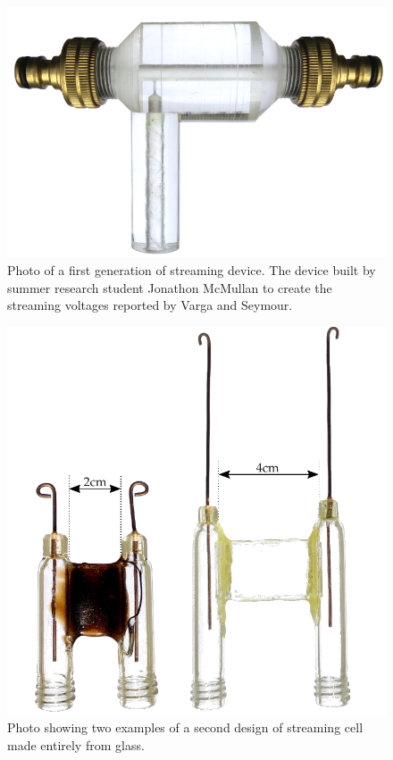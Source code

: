     \begin{figure}
      \centering
      \includegraphics[scale=0.9]{content/pt1/01-PowerHarvesting/graphics/StreamingCell_v0}
      \caption[Photo showing a first generation of streaming device.]{\label{fig:first_cell}Photo of a first generation of streaming device. The device built by summer research student Jonathon McMullan to create the streaming voltages reported by Varga and Seymour.}
    \end{figure}
    \begin{figure}
      \centering
      \includegraphics[scale=0.7]{content/pt1/01-PowerHarvesting/graphics/StreamingCells_v1}
      \caption{\label{fig:first_cells}Photo showing two examples of a second design of streaming cell made entirely from glass.}
    \end{figure}


